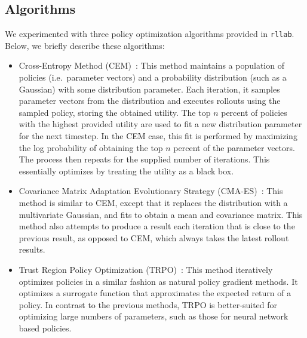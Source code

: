 \subsection{Algorithms}
We experimented with three policy optimization algorithms provided in
\texttt{rllab}. Below, we briefly describe these algorithms:

\begin{itemize}
    \item Cross-Entropy Method (CEM)~\cite{rubinstein2013cross,
        policyoptimizationNIPS2016}: This method maintains a population of
        policies (i.e.\ parameter vectors) and a probability distribution (such
        as a Gaussian) with some distribution parameter.  Each iteration, it
        samples parameter vectors from the distribution and executes rollouts
        using the sampled policy, storing the obtained utility.  The top $n$
        percent of policies with the highest provided utility are used to fit
        a new distribution parameter for the next timestep. In the CEM case,
        this fit is performed by maximizing the log probability of obtaining
        the top $n$ percent of the parameter vectors. The process then repeats
        for the supplied number of iterations. This essentially optimizes by 
        treating the utility as a black box.

    \item Covariance Matrix Adaptation Evolutionary Strategy
        (CMA-ES)~\cite{cmaes, policyoptimizationNIPS2016}: This method is
        similar to CEM, except that it replaces the distribution with
        a multivariate Gaussian, and fits to obtain a mean and covariance matrix.
        This method also attempts to produce a result each iteration that is
        close to the previous result, as opposed to CEM, which always takes the
        latest rollout results.

    \item Trust Region Policy Optimization (TRPO)~\cite{TRPO,
        policyoptimizationNIPS2016}: This method iteratively optimizes policies
        in a similar fashion as natural policy gradient methods. It optimizes
        a surrogate function that approximates the expected return of a policy.
        In contrast to the previous methods, TRPO is better-suited for
        optimizing large numbers of parameters, such as those for neural
        network based policies.
\end{itemize}
